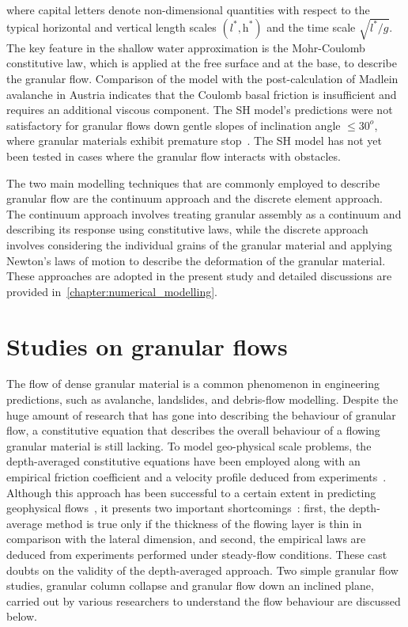 %
where capital letters denote non-dimensional quantities with respect to the 
typical horizontal and vertical length scales $(\textit{l}^{*},\textit{h}^{*})$ 
and the time scale $\sqrt{\textit{l}^{*}/\textit{g}}$. The key feature in the 
shallow water approximation is the Mohr-Coulomb constitutive law, which is 
applied at the free surface and at the base, to describe the granular flow. 
Comparison of the model with the post-calculation of Madlein avalanche in 
Austria indicates that the Coulomb basal friction is insufficient and requires 
an additional viscous component. The SH model's predictions were not 
satisfactory for granular flows down gentle slopes of inclination angle $\le 
30^{o}$, where granular materials exhibit premature stop~\citep{Hutter2005}. 
The SH model has not yet been tested in cases where the granular flow interacts 
with obstacles.

The two main modelling techniques that are commonly employed to describe 
granular flow are the continuum approach and the discrete element approach. The 
continuum approach involves treating granular assembly as a continuum and 
describing its response using constitutive laws, while the discrete approach 
involves considering the individual grains of the granular material and 
applying Newton's laws of motion to describe the deformation of the granular 
material. These approaches are adopted in the present study and detailed 
discussions are provided in~\cref{chapter:numerical_modelling}. 

\section{Studies on granular flows}
The flow of dense granular material is a common phenomenon in engineering 
predictions, such as avalanche, landslides, and debris-flow modelling. Despite 
the huge amount of research that has gone into describing the behaviour of 
granular flow, a constitutive equation that describes the overall behaviour of 
a flowing granular material is still lacking. To model geo-physical scale 
problems, the depth-averaged constitutive equations have been employed along 
with an empirical friction coefficient and a velocity profile deduced from 
experiments~\citep{Midi2004,Iverson2003,Pouliquen1999}. Although this approach 
has been successful to a certain extent in predicting geophysical 
flows~\citep{Pouliquen2002a, Hutter1995}, it presents two important 
shortcomings~\citep{Lajeunesse2005}: first, the depth-average method is true 
only if the thickness of the flowing layer is thin in comparison with the 
lateral dimension, and second, the empirical laws are deduced from experiments 
performed under steady-flow conditions. These cast doubts on the validity of 
the depth-averaged approach. Two simple granular flow studies, granular column 
collapse and granular flow down an inclined plane, carried out by 
various researchers to understand the flow behaviour are discussed below.



